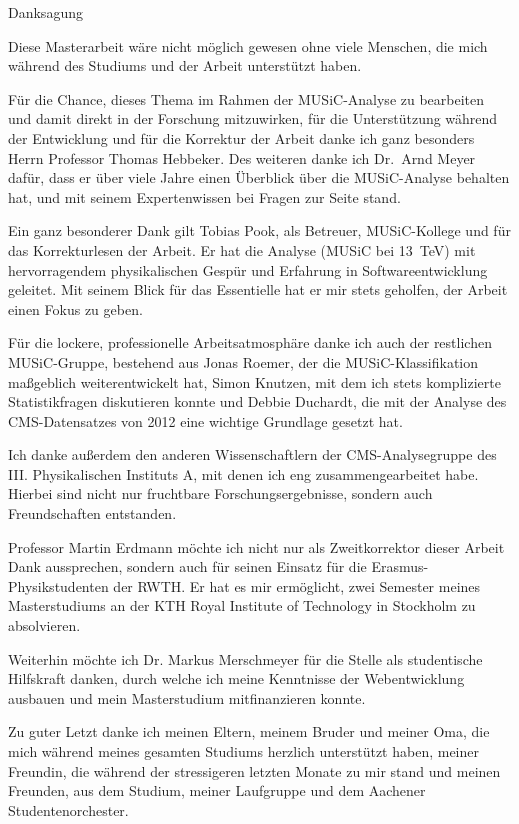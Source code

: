 
\thispagestyle{plain}
{Danksagung}
\chapterheadendvskip

Diese Masterarbeit wäre nicht möglich gewesen ohne viele Menschen, die mich während des Studiums und der Arbeit unterstützt haben.

Für die Chance, dieses Thema im Rahmen der \ac{MUSiC}-Analyse zu bearbeiten und damit direkt in der Forschung mitzuwirken, für die Unterstützung während der Entwicklung und für die Korrektur der Arbeit danke ich ganz besonders Herrn Professor Thomas Hebbeker.
Des weiteren danke ich Dr.~Arnd Meyer dafür, dass er über viele Jahre einen Überblick über die \ac{MUSiC}-Analyse behalten hat, und mit seinem Expertenwissen bei Fragen zur Seite stand.

Ein ganz besonderer Dank gilt Tobias Pook, als Betreuer, \ac{MUSiC}-Kollege und für das Korrekturlesen der Arbeit. Er hat die Analyse (\ac{MUSiC} bei \SI{13}{\TeV}) mit hervorragendem physikalischen Gespür und Erfahrung in Softwareentwicklung geleitet. Mit seinem Blick für das Essentielle hat er mir stets geholfen, der Arbeit einen Fokus zu geben.

Für die lockere, professionelle Arbeitsatmosphäre danke ich auch der restlichen \ac{MUSiC}-Gruppe, bestehend aus Jonas Roemer, der die \ac{MUSiC}-Klassifikation maßgeblich weiterentwickelt hat, Simon Knutzen, mit dem ich stets komplizierte Statistikfragen diskutieren konnte und Debbie Duchardt, die mit der Analyse des \ac{CMS}-Datensatzes von 2012 eine wichtige Grundlage gesetzt hat.

Ich danke außerdem den anderen Wissenschaftlern der \ac{CMS}-Analysegruppe des III. Physikalischen Instituts A, mit denen ich eng zusammengearbeitet habe. Hierbei sind nicht nur fruchtbare Forschungsergebnisse, sondern auch Freundschaften entstanden.

Professor Martin Erdmann möchte ich nicht nur als Zweitkorrektor dieser Arbeit Dank aussprechen, sondern auch für seinen Einsatz für die Erasmus-Physikstudenten der RWTH. Er hat es mir ermöglicht, zwei Semester meines Masterstudiums an der KTH Royal Institute of Technology in Stockholm zu absolvieren.

Weiterhin möchte ich Dr. Markus Merschmeyer für die Stelle als studentische Hilfskraft danken, durch welche ich meine Kenntnisse der Webentwicklung ausbauen und mein Masterstudium mitfinanzieren konnte.

Zu guter Letzt danke ich meinen Eltern, meinem Bruder und meiner Oma, die mich während meines gesamten Studiums herzlich unterstützt haben, meiner Freundin, die während der stressigeren letzten Monate zu mir stand und meinen Freunden, aus dem Studium, meiner Laufgruppe und dem Aachener Studentenorchester.
